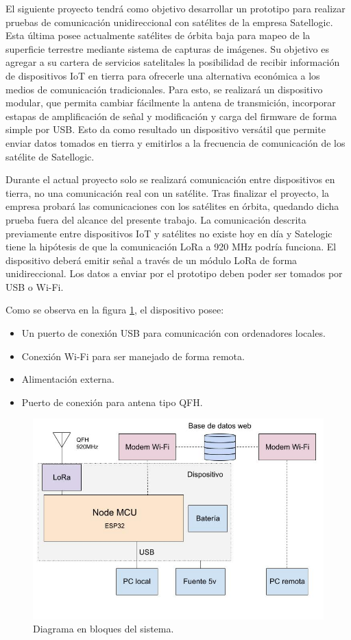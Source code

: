 \documentclass[
11pt, %
codirector, %
]{charter}
\begin{document}
El siguiente proyecto tendrá como objetivo desarrollar un prototipo para realizar pruebas de comunicación unidireccional con satélites de la empresa Satellogic. Esta última posee actualmente satélites de órbita baja para mapeo de la superficie terrestre mediante sistema de capturas de imágenes. Su objetivo es agregar a su cartera de servicios satelitales la posibilidad de recibir información de dispositivos IoT en tierra para ofrecerle una alternativa económica a los medios de comunicación tradicionales. Para esto, se realizará un dispositivo modular, que permita cambiar fácilmente la antena de transmición, incorporar estapas de amplificación de señal y modificación y carga del firmware de forma simple por USB. Esto da como resultado un dispositivo versátil que permite enviar datos tomados en tierra y emitirlos a la frecuencia de comunicación de los satélite de Satellogic.

Durante el actual proyecto solo se realizará comunicación entre dispositivos en tierra, no una comunicación real con un satélite. Tras finalizar el proyecto, la empresa probará las comunicaciones con los satélites en órbita, quedando dicha prueba fuera del alcance del presente trabajo. La comunicación descrita previamente entre dispositivos IoT y satélites no existe hoy en día y Satelogic tiene la hipótesis de que la comunicación LoRa a 920 MHz podría funciona.
El dispositivo deberá emitir señal a través de un módulo LoRa de forma unidireccional. Los datos a enviar por el prototipo deben poder ser tomados por USB o Wi-Fi.


Como se observa en la figura \ref{fig:diagBloques}, el dispositivo posee:
\begin{itemize}
	\item Un puerto de conexión USB para comunicación con ordenadores locales.
	\item Conexión Wi-Fi para ser manejado de forma remota.
	\item Alimentación externa.
	\item Puerto de conexión para antena tipo QFH.
\end{itemize}

\begin{figure}[htpb]
\centering 
\includegraphics[width=.8\textwidth]{./Figuras/Diagrama de bloques.jpg}
\caption{Diagrama en bloques del sistema.}
\label{fig:diagBloques}
\end{figure}
\end{document}
